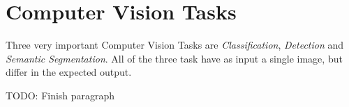 \section{Computer Vision Tasks} \label{sec:tasks}

Three very important Computer Vision Tasks are \emph{Classification}, \emph{Detection} and \emph{Semantic Segmentation}. All of the three task have as input a single image, but differ in the expected output.

TODO: Finish paragraph

\iffalse

\section{Historical Review}\label{sec:review}



Krizhevsky et. al \cite{AlexNet} won the .

AlexNet was improved by several Authors in the succeeding years to achieve even better classification results in the ILSVRC-2013 and 2014. Most notable are GoogLeNet \cite{googLeNeT} and VGG16 \cite{VGG16}. Being designed independently, both Networks utilize filters with very small kernel size ($3\times 3$ and $1 \times 1$) and other parameter reduction techniques in order to severely increase the depths of their network.


\cite{AlexNet} al introduced a novel \gls{CNN} architecture. 

\fi







